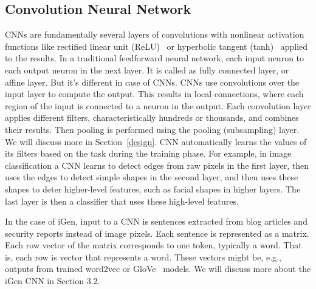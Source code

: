 \subsection{Convolution Neural Network}
CNNs are fundamentally several layers of convolutions with nonlinear activation functions like rectified linear unit (ReLU)~\cite{nair} or hyperbolic tangent (tanh)~\cite{goodfellow} applied to the results. In a traditional feedforward neural network, each input neuron to each output neuron in the next layer. It is called as fully connected layer, or affine layer. But it's different in case of CNNs. CNNs use convolutions over the input layer to compute the output. This results in local connections, where each region of the input is connected to a neuron in the output. Each convolution layer applies different filters, characteristically hundreds or thousands, and combines their results. Then pooling is performed using the pooling (subsampling) layer. We will discuss more in Section~\ref{design}. CNN automatically learns the values of its filters based on the task during the training phase. For example, in image classification a CNN learns to detect edges from raw pixels in the first layer, then uses the edges to detect simple shapes in the second layer, and then uses these shapes to deter higher-level features, such as facial shapes in higher layers. The last layer is then a classifier that uses these high-level features. 



In the case of iGen, input to a CNN is sentences extracted from blog articles and security reports instead of image pixels. Each sentence is represented as a matrix. Each row vector of the matrix corresponds to one token, typically a word. That is, each row is vector that represents a word. These vectors might be, e.g., outputs from trained word2vec or GloVe~\cite{pennington} models. We will discuss more about the iGen CNN in Section 3.2. 




